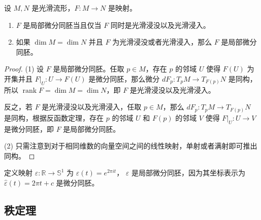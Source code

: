 \documentclass[fontset=none]{Notes}
\DeclareMathOperator\rk{rank}
\begin{document}
\begin{proposition}\label{prop:local diffeomorphism}
  设 $M,N$ 是光滑流形，$F:M\to N$ 是映射。
  \begin{enumerate}
    \item $F$ 是局部微分同胚当且仅当 $F$ 同时是光滑浸没以及光滑浸入。
    \item 如果 $\dim M=\dim N$ 并且 $F$ 为光滑浸没或者光滑浸入，那么
    $F$ 是局部微分同胚。
  \end{enumerate}
\end{proposition}
\begin{proof}
  (1) 设 $F$ 是局部微分同胚。任取 $p\in M$，存在 $p$ 的邻域 $U$ 使得 $F(U)$
  为开集并且 $F|_U:U\to F(U)$ 是微分同胚，那么微分 $dF_p:T_pM\to T_{F(p)}N$
  是同构，所以 $\rk F=\dim M=\dim N$，即 $F$ 是光滑浸没以及光滑浸入。

  反之，若 $F$ 是光滑浸没以及光滑浸入，任取 $p\in M$，那么 $dF_p:T_pM\to T_{F(p)}N$
  是同构，根据反函数定理，存在 $p$ 的邻域 $U$ 和 $F(p)$ 的邻域 $V$ 使得
  $F|_U:U\to V$ 是微分同胚，即 $F$ 是局部微分同胚。

  (2) 只需注意到对于相同维数的向量空间之间的线性映射，单射或者满射即可推出同构。
\end{proof}

\begin{example}[局部微分同胚]
  定义映射 $\varepsilon:\mathbb{R}\to\mathbb{S}^1$ 为 $\varepsilon(t)=e^{2\pi it}$，
  $\varepsilon$ 是局部微分同胚，因为其坐标表示为 $\hat\varepsilon(t)=2\pi t+c$
  是微分同胚。  
\end{example}





\subsection{秩定理}
\end{document}
